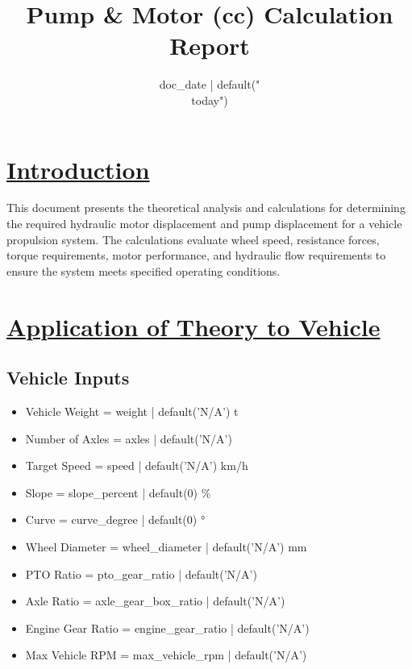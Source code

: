 \documentclass[14pt]{article}
\title{\textbf{Pump \& Motor (cc) Calculation Report}}
\date{{ doc_date | default("\\today") }}
\begin{document}
\maketitle


\section*{\underline{Introduction}}

This document presents the theoretical analysis and calculations for determining the required hydraulic motor displacement and pump displacement for a vehicle propulsion system. The calculations evaluate wheel speed, resistance forces, torque requirements, motor performance, and hydraulic flow requirements to ensure the system meets specified operating conditions.



\section{\underline{Application of Theory to Vehicle}}

\subsection*{Vehicle Inputs}
\begin{itemize}
\item Vehicle Weight = {{ weight | default('N/A') }} t
\item Number of Axles = {{ axles | default('N/A') }}
\item Target Speed = {{ speed | default('N/A') }} km/h
\item Slope = {{ slope_percent | default(0) }} \%
\item Curve = {{ curve_degree | default(0) }}°
\item Wheel Diameter = {{ wheel_diameter | default('N/A') }} mm
\item PTO Ratio = {{ pto_gear_ratio | default('N/A') }}
\item Axle Ratio = {{ axle_gear_box_ratio | default('N/A') }}
\item Engine Gear Ratio = {{ engine_gear_ratio | default('N/A') }}
\item Max Vehicle RPM = {{ max_vehicle_rpm | default('N/A') }}
\end{itemize}
\end{document}

